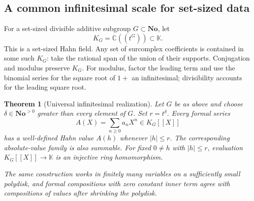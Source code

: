 \documentclass[11pt,a4paper]{article}
\numberwithin{equation}{section}
\newtheorem{theorem}{Theorem}[section]
\theoremstyle{definition}
\theoremstyle{remark}
\newcommand{\No}{\mathbf{No}}
\newcommand{\K}{\mathbb K}
\newcommand{\C}{\mathbb C}
\begin{document}
\subsection{A common infinitesimal scale for set-sized data}
For a set-sized divisible additive subgroup $G\subset\No$, let
\[
 K_G=\C((t^G))\subset\K.
\]
This is a set-sized Hahn field. Any set of surcomplex coefficients is contained in some such $K_G$: take the rational span of the union of their supports. Conjugation and modulus preserve $K_G$. For modulus, factor the leading term and use the binomial series for the square root of $1+$ an infinitesimal; divisibility accounts for the leading square root.

\begin{theorem}[Universal infinitesimal realization]
\label{thm:realization}
Let $G$ be as above and choose $\delta\in\No^{>0}$ greater than every element of $G$. Set $r=t^\delta$. Every formal series
\[
 A(X)=\sum_{n\geq0}a_nX^n\in K_G[[X]]
\]
has a well-defined Hahn value $A(h)$ whenever $|h|\leq r$. The corresponding absolute-value family is also summable. For fixed $0\ne h$ with $|h|\leq r$, evaluation $K_G[[X]]\to\K$ is an injective ring homomorphism.

The same construction works in finitely many variables on a sufficiently small polydisk, and formal compositions with zero constant inner term agree with compositions of values after shrinking the polydisk.
\end{theorem}
\end{document}

